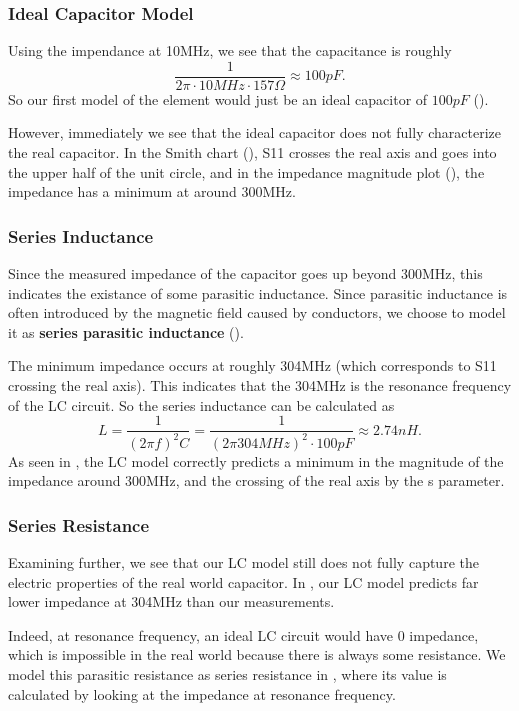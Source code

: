\documentclass{article}
\begin{document}
\subsubsection{Ideal Capacitor Model}

Using the impendance at 10MHz, we see that the capacitance is roughly
$$\frac{1}{2\pi\cdot 10MHz \cdot 157 \Omega} \approx 100pF .$$
So our first model of the element would just be an ideal capacitor of $100pF$ ().

However, immediately we see that the ideal capacitor does not fully characterize the real capacitor.
In the Smith chart (), S11 crosses the real axis and goes into the upper half of the unit circle, and in the impedance magnitude plot (), the impedance has a minimum at around 300MHz.

\subsubsection{Series Inductance}
Since the measured impedance of the capacitor goes up beyond 300MHz, this indicates the existance of some parasitic inductance.
Since parasitic inductance is often introduced by the magnetic field caused by conductors, we choose to model it as \textbf{series parasitic inductance} ().

The minimum impedance occurs at roughly 304MHz (which corresponds to S11 crossing the real axis).
This indicates that the 304MHz is the resonance frequency of the LC circuit.
So the series inductance can be calculated as
\[
    L = \frac{1}{(2\pi f)^2 C}
    = \frac{1}{(2\pi 304MHz)^2 \cdot 100pF}
    \approx
    2.74nH.
\]
As seen in , the LC model correctly predicts a minimum in the magnitude of the impedance around 300MHz, and the crossing of the real axis by the s parameter.

\subsubsection{Series Resistance}
Examining  further, we see that our LC model still does not fully capture the electric properties of the real world capacitor.
In , our LC model predicts far lower impedance at 304MHz than our measurements.

Indeed, at resonance frequency, an ideal LC circuit would have $0$ impedance, which is impossible in the real world because there is always some resistance.
We model this parasitic resistance as series resistance in , where its value is calculated by looking at the impedance at resonance frequency.
\end{document}
